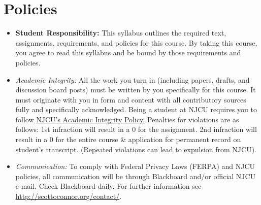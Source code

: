 \documentclass[article,oneside]{memoir}
\begin{document}
\section{Policies}

\begin{itemize}

\item \textbf{Student Responsibility:} This syllabus outlines the required text, assignments, requirements, and policies for this course. By taking this course, you agree to read this syllabus and be bound by those requirements and policies. 

 \item \textit{Academic Integrity:} All the work you turn in (including papers, drafts, and discussion board posts) must be written by you specifically for this course. It must originate with you in form and content with all contributory sources fully and specifically acknowledged. Being a student at NJCU requires you to follow \href{http://scottoconnor.org/resources/Plagiarism.pdf}{NJCU's Academic Integrity Policy.} Penalties for violations are as follows: 1st infraction will result in a 0 for the assignment.  2nd infraction will result in a 0 for the entire course \& application for permanent record on student's transcript. (Repeated violations can lead to expulsion from NJCU). 





\item \textit{Communication:} To comply with Federal Privacy Laws (FERPA) and NJCU policies, all communication will be through Blackboard and/or official NJCU e-mail. Check Blackboard daily. For further information see \href{http://scottoconnor.org/contact/}{http://scottoconnor.org/contact/}.





\end{itemize}
\end{document}
